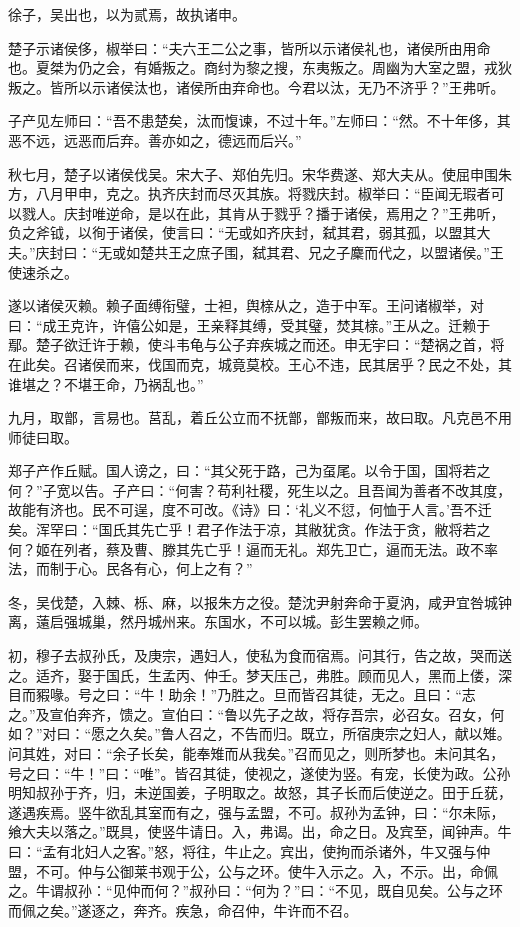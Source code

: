 \documentclass[]{article}
\begin{document}
徐子，吴出也，以为贰焉，故执诸申。

楚子示诸侯侈，椒举曰：``夫六王二公之事，皆所以示诸侯礼也，诸侯所由用命也。夏桀为仍之会，有婚叛之。商纣为黎之搜，东夷叛之。周幽为大室之盟，戎狄叛之。皆所以示诸侯汰也，诸侯所由弃命也。今君以汰，无乃不济乎？''王弗听。

子产见左师曰：``吾不患楚矣，汰而愎谏，不过十年。''左师曰：``然。不十年侈，其恶不远，远恶而后弃。善亦如之，德远而后兴。''

秋七月，楚子以诸侯伐吴。宋大子、郑伯先归。宋华费遂、郑大夫从。使屈申围朱方，八月甲申，克之。执齐庆封而尽灭其族。将戮庆封。椒举曰：``臣闻无瑕者可以戮人。庆封唯逆命，是以在此，其肯从于戮乎？播于诸侯，焉用之？''王弗听，负之斧钺，以徇于诸侯，使言曰：``无或如齐庆封，弑其君，弱其孤，以盟其大夫。''庆封曰：``无或如楚共王之庶子围，弑其君、兄之子麇而代之，以盟诸侯。''王使速杀之。

遂以诸侯灭赖。赖子面缚衔璧，士袒，舆榇从之，造于中军。王问诸椒举，对曰：``成王克许，许僖公如是，王亲释其缚，受其璧，焚其榇。''王从之。迁赖于鄢。楚子欲迁许于赖，使斗韦龟与公子弃疾城之而还。申无宇曰：``楚祸之首，将在此矣。召诸侯而来，伐国而克，城竟莫校。王心不违，民其居乎？民之不处，其谁堪之？不堪王命，乃祸乱也。''

九月，取鄫，言易也。莒乱，着丘公立而不抚鄫，鄫叛而来，故曰取。凡克邑不用师徒曰取。

郑子产作丘赋。国人谤之，曰：``其父死于路，己为虿尾。以令于国，国将若之何？''子宽以告。子产曰：``何害？苟利社稷，死生以之。且吾闻为善者不改其度，故能有济也。民不可逞，度不可改。《诗》曰：`礼义不愆，何恤于人言。'吾不迁矣。浑罕曰：``国氏其先亡乎！君子作法于凉，其敝犹贪。作法于贪，敝将若之何？姬在列者，蔡及曹、滕其先亡乎！逼而无礼。郑先卫亡，逼而无法。政不率法，而制于心。民各有心，何上之有？''

冬，吴伐楚，入棘、栎、麻，以报朱方之役。楚沈尹射奔命于夏汭，咸尹宜咎城钟离，薳启强城巢，然丹城州来。东国水，不可以城。彭生罢赖之师。

初，穆子去叔孙氏，及庚宗，遇妇人，使私为食而宿焉。问其行，告之故，哭而送之。适齐，娶于国氏，生孟丙、仲壬。梦天压己，弗胜。顾而见人，黑而上偻，深目而豭喙。号之曰：``牛！助余！''乃胜之。旦而皆召其徒，无之。且曰：``志之。''及宣伯奔齐，馈之。宣伯曰：``鲁以先子之故，将存吾宗，必召女。召女，何如？''对曰：``愿之久矣。''鲁人召之，不告而归。既立，所宿庚宗之妇人，献以雉。问其姓，对曰：``余子长矣，能奉雉而从我矣。''召而见之，则所梦也。未问其名，号之曰：``牛！''曰：``唯''。皆召其徒，使视之，遂使为竖。有宠，长使为政。公孙明知叔孙于齐，归，未逆国姜，子明取之。故怒，其子长而后使逆之。田于丘莸，遂遇疾焉。竖牛欲乱其室而有之，强与孟盟，不可。叔孙为孟钟，曰：``尔未际，飨大夫以落之。''既具，使竖牛请日。入，弗谒。出，命之日。及宾至，闻钟声。牛曰：``孟有北妇人之客。''怒，将往，牛止之。宾出，使拘而杀诸外，牛又强与仲盟，不可。仲与公御莱书观于公，公与之环。使牛入示之。入，不示。出，命佩之。牛谓叔孙：``见仲而何？''叔孙曰：``何为？''曰：``不见，既自见矣。公与之环而佩之矣。''遂逐之，奔齐。疾急，命召仲，牛许而不召。
\end{document}

